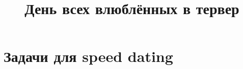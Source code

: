 \documentclass[12pt]{article}
\title{День всех влюблённых в тервер}
\date{}
\begin{document}
	\maketitle

\section{Задачи для speed dating}
\end{document}
